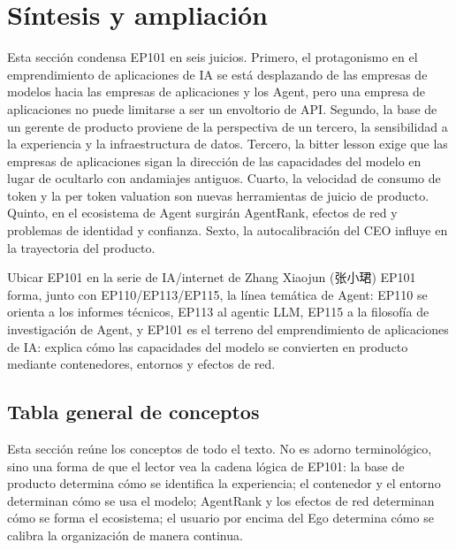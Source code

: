 \section{Síntesis y ampliación}

Esta sección condensa EP101 en seis juicios. Primero, el protagonismo en el emprendimiento de aplicaciones de IA se está desplazando de las empresas de modelos hacia las empresas de aplicaciones y los Agent, pero una empresa de aplicaciones no puede limitarse a ser un envoltorio de API. Segundo, la base de un gerente de producto proviene de la perspectiva de un tercero, la sensibilidad a la experiencia y la infraestructura de datos. Tercero, la bitter lesson exige que las empresas de aplicaciones sigan la dirección de las capacidades del modelo en lugar de ocultarlo con andamiajes antiguos. Cuarto, la velocidad de consumo de token y la per token valuation son nuevas herramientas de juicio de producto. Quinto, en el ecosistema de Agent surgirán AgentRank, efectos de red y problemas de identidad y confianza. Sexto, la autocalibración del CEO influye en la trayectoria del producto.

\begin{importantbox}{Ubicar EP101 en la serie de IA/internet de Zhang Xiaojun (张小珺)}
EP101 forma, junto con EP110/EP113/EP115, la línea temática de Agent: EP110 se orienta a los informes técnicos, EP113 al agentic LLM, EP115 a la filosofía de investigación de Agent, y EP101 es el terreno del emprendimiento de aplicaciones de IA: explica cómo las capacidades del modelo se convierten en producto mediante contenedores, entornos y efectos de red.
\end{importantbox}

\subsection{Tabla general de conceptos}

Esta sección reúne los conceptos de todo el texto. No es adorno terminológico, sino una forma de que el lector vea la cadena lógica de EP101: la base de producto determina cómo se identifica la experiencia; el contenedor y el entorno determinan cómo se usa el modelo; AgentRank y los efectos de red determinan cómo se forma el ecosistema; el usuario por encima del Ego determina cómo se calibra la organización de manera continua.


